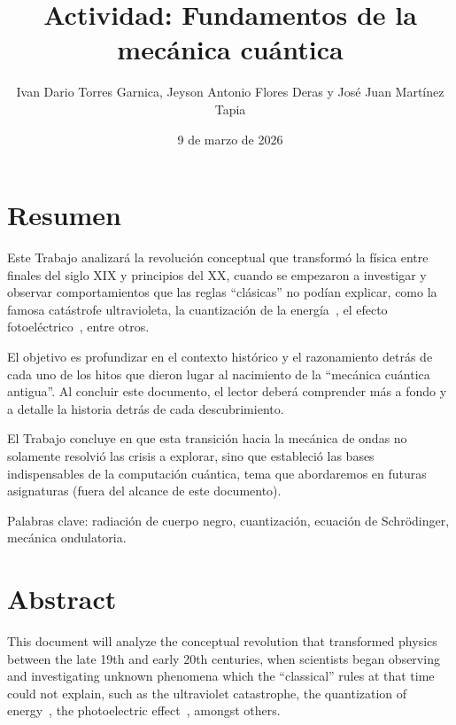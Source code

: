 \documentclass[11pt,a4paper,spanish]{book}
\title{Actividad: Fundamentos de la mecánica cuántica}
\author{Ivan Dario Torres
Garnica, Jeyson Antonio Flores Deras y José Juan Martínez Tapia}
\date{9 de marzo de 2026}
\begin{document}
\renewcommand{\listfigurename}{Índice de figuras}
\renewcommand{\contentsname}{Índice de contenidos}
\renewcommand{\figurename}{Figura}
\renewcommand{\tablename}{Tabla}

\maketitle

\frontmatter
\tableofcontents
\listoffigures %

\chapter{Resumen}

Este Trabajo analizará la revolución conceptual que transformó la
física entre finales del siglo XIX y principios del XX, cuando se
empezaron a investigar y observar comportamientos que las reglas
``clásicas'' no podían explicar, como la famosa catástrofe
ultravioleta, la cuantización de la
energía~\cite{planck1900}, el efecto
fotoeléctrico~\cite{einsteina1905_photoelectric}, entre otros.

El objetivo es profundizar en el contexto histórico y el razonamiento
detrás de cada uno de los hitos que dieron lugar al nacimiento de la
``mecánica cuántica antigua''. Al concluir este documento, el lector
deberá comprender más a fondo y a detalle la historia detrás de cada
descubrimiento.

El Trabajo concluye en que esta transición hacia la mecánica de ondas
no solamente resolvió las crisis a explorar, sino que estableció las
bases indispensables de la computación cuántica, tema que abordaremos
en futuras asignaturas (fuera del alcance de este documento).

Palabras clave: radiación de cuerpo negro, cuantización,
ecuación de Schrödinger, mecánica ondulatoria.

\chapter{Abstract}

This document will analyze the conceptual revolution that transformed
physics between the late 19th and early 20th centuries, when
scientists began observing and investigating unknown phenomena which
the ``classical'' rules at that time could not explain, such as the
ultraviolet catastrophe, the quantization of
energy~\cite{planck1900}, the photoelectric
effect~\cite{einsteina1905_photoelectric}, amongst others.
\end{document}
